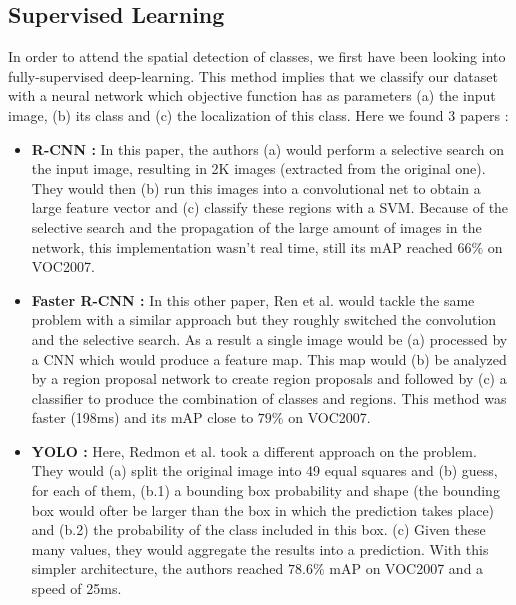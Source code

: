 		\subsection{Supervised Learning}
		\label{sub:supervised_learning}
			In order to attend the spatial detection of classes, we first have been looking into fully-supervised deep-learning. This method implies that we classify our dataset with a neural network which objective function has as parameters (a) the input image, (b) its class and (c) the localization of this class. Here we found 3 papers :
			\begin{itemize}
				\item \textbf{R-CNN\cite{girshick2014rich} :} In this paper, the authors (a) would perform a selective search on the input image, resulting in 2K images (extracted from the original one). They would then (b) run this images into a convolutional net to obtain a large feature vector and (c) classify these regions with a SVM. Because of the selective search and the propagation of the large amount of images in the network, this implementation wasn't real time, still its mAP reached $66\%$ on VOC2007.
				\item \textbf{Faster R-CNN\cite{ren2015faster} : } In this other paper, Ren et al. would tackle the same problem with a similar approach but they roughly switched the convolution and the selective search. As a result a single image would be (a) processed by a CNN which would produce a feature map. This map would (b) be analyzed by a region proposal network to create region proposals and followed by (c) a classifier to produce the combination of classes and regions. This method was faster (198ms) and its mAP close to $79\%$ on VOC2007.
				\item \textbf{YOLO\cite{redmon2015you} :} Here, Redmon et al. took a different approach on the problem. They would (a) split the original image into 49 equal squares and (b) guess, for each of them, (b.1) a bounding box probability and shape (the bounding box would ofter be larger than the box in which the prediction takes place) and (b.2) the probability of the class included in this box. (c) Given these many values, they would aggregate the results into a prediction. With this simpler architecture, the authors reached $78.6\%$ mAP on VOC2007 and a speed of 25ms.
			\end{itemize}

